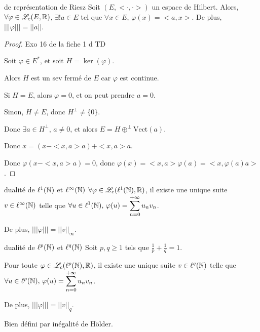 \begin{theoreme}{de représentation de Riesz}{}
    Soit $(E, <\cdot, \cdot>)$ un espace de Hilbert. Alors, $\forall \varphi \in \mathscr L_c(E, \mathbb{R})$,
    $\exists ! a \in E$ tel que $\forall x \in E, \, \varphi(x) = <a, x>$. De plus, $|||\varphi||| = ||a||$.
\end{theoreme}



\begin{proof} Exo 16 de la fiche 1 d TD 
    
    Soit $\varphi \in E^*$, et soit $H = \ker(\varphi)$. 

    Alors $H$ est un sev fermé de $E$ car $\varphi$ est continue.

    Si $H = E$, alors $\varphi = 0$, et on peut prendre $a = 0$.

    Sinon, $H \neq E$, donc $H^\perp \neq \{0\}$.

    Donc $\exists a \in H^\perp$, $a \neq 0$, et alors $E = H \oplus^\perp \text{Vect}(a)$.

    Donc $x = (x - <x, a>a) + <x, a>a$.

    Donc $\varphi(x - <x, a>a) = 0$, donc $\varphi(x) = <x, a> \varphi(a) = <x, \varphi(a)a>$.

\end{proof}

\begin{theoreme}{dualité de $\ell^1(\mathbb{N})$ et $\ell^\infty(\mathbb{N})$}{}
    $\forall \varphi \in \mathscr L_c(\ell^1(\mathbb{N}), \mathbb{R})$, il existe une unique suite $v \in \ell^\infty(\mathbb{N})$ 
    telle que $\displaystyle \forall u \in \ell^1(\mathbb{N}), \, \varphi(u) = \sum_{n=0}^{+\infty} u_n v_n$.

    De plus, $|||\varphi||| = ||v||_\infty$.
    
\end{theoreme}

\begin{theoreme}{dualité de $\ell^p(\mathbb{N})$ et $\ell^q(\mathbb{N})$}{}
    Soit $p, q \geqslant 1$ tels que $\frac{1} {p} + \frac{1}{q} = 1$.

    Pour toute $\varphi \in \mathscr L_c(\ell^p(\mathbb{N}), \mathbb{R})$, il existe une unique suite $v \in \ell^q(\mathbb{N})$ 
    telle que $\displaystyle \forall u \in \ell^p(\mathbb{N}), \, \varphi(u) = \sum_{n=0}^{+\infty} u_n v_n$.

    De plus, $|||\varphi||| = ||v||_q$.
    
    Bien défini par inégalité de Hölder.
\end{theoreme}

